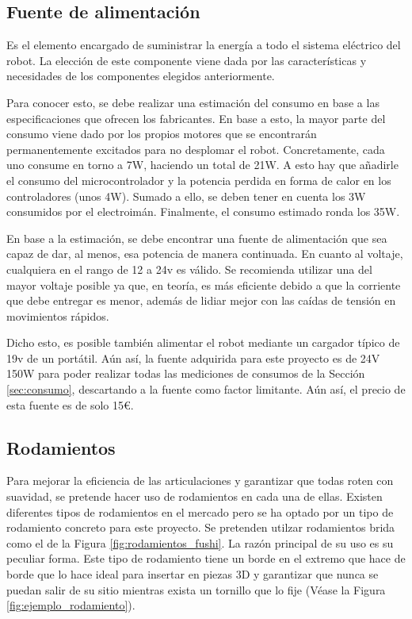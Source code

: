 \newpage
\subsection{Fuente de alimentación}
\noindent Es el elemento encargado de suministrar la energía a todo el sistema eléctrico del robot. La elección de este componente viene dada 
por las características y necesidades de los componentes elegidos anteriormente. 

Para conocer esto, se debe realizar una estimación del consumo en base a las especificaciones que ofrecen los fabricantes. En base a esto, la mayor 
parte del consumo viene dado por los propios motores que se encontrarán permanentemente excitados para no desplomar el robot. Concretamente,
cada uno consume en torno a 7W, haciendo un total de 21W. A esto hay que añadirle el consumo del microcontrolador y la potencia 
perdida en forma de calor en los controladores (unos 4W). Sumado a ello, se deben tener en cuenta los 3W consumidos por el electroimán. Finalmente, 
el consumo estimado ronda los 35W.

En base a la estimación, se debe encontrar una fuente de alimentación que sea capaz de dar, al menos, esa potencia de manera continuada. En cuanto al 
voltaje, cualquiera en el rango de 12 a 24v es válido. Se recomienda utilizar una del mayor voltaje posible ya que, en teoría, es más eficiente 
debido a que la corriente que debe entregar es menor, además de lidiar mejor con las caídas de tensión en movimientos rápidos.

Dicho esto, es posible también alimentar el robot mediante un cargador típico de 19v de un portátil. Aún así, la fuente adquirida para 
este proyecto es de 24V 150W para poder realizar todas las mediciones de consumos de la Sección \ref{sec:consumo}, descartando a la fuente 
como factor limitante. Aún así, el precio de esta fuente es de solo 15\euro.

\subsection{Rodamientos}
\label{sec:bridas}
\noindent Para mejorar la eficiencia de las articulaciones y garantizar que todas roten con suavidad, se pretende hacer uso de rodamientos 
en cada una de ellas. 
Existen diferentes tipos de rodamientos en el mercado pero se ha optado por un tipo de rodamiento concreto para este proyecto. 
Se pretenden utilzar rodamientos brida como el de la Figura \ref{fig:rodamientos_fushi}. La razón principal de su uso es su peculiar forma. Este tipo 
de rodamiento tiene un borde en el extremo que hace de borde que lo hace ideal para insertar en piezas 3D y garantizar 
que nunca se puedan salir de su sitio mientras exista un tornillo que lo fije (Véase la Figura \ref{fig:ejemplo_rodamiento}).

